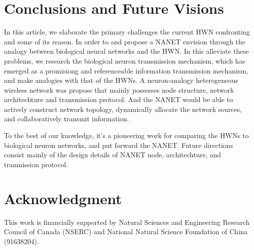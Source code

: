 \documentclass[journal,comsoc]{IEEEtran}
\begin{document}
	\section{Conclusions and Future Visions}
	\label{section: Conclusion}
		In this article, we elaborate the primary challenges the current HWN confronting and some of its reason.
		In order to and propose a NANET envision through the analogy between biological neural networks and the HWN.
		In this alleviate these problems, we research the biological neuron transmission mechanism, which has emerged as a  promisiong and referenceable information transmission mechanism, 
		and make analogies with that of the HWNs.
		A neuron-analogy heterogeneous wireless network was propose that mainly possesses node structure, network architechture and transmission protocol.
		And the NANET would be able to actively construct network topology, dynamically allocate the network sources, and collaboratively transmit information.

		To the best of our knowledge, it's a pioneering work for comparing the HWNs to biological neuron networks, and put forward the NANET. 
		Future directions consist mainly of the design details of NANET node, architechture, and tranmission protocol.
		
	\appendices
	\section*{Acknowledgment}
	This work is financially supported by Natural Sciences and Engineering Research Council of Canada (NSERC) and National Natural Science Foundation of China (91638204).
	
	\nocite{*}
	
	
	\ifCLASSOPTIONcaptionsoff
	\newpage
	\fi
	
	
\end{document}
